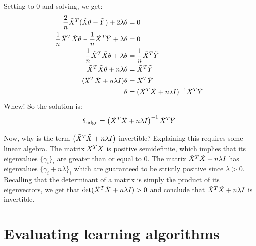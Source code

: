 Setting to 0 and solving, we get:
\begin{align*}
  \frac{2}{n}\tilde{X}^T(\tilde{X}\theta - \tilde{Y}) + 2 \lambda \theta             & = 0                                      \\
  \frac{1}{n}\tilde{X}^T\tilde{X}\theta - \frac{1}{n}\tilde{X}^T\tilde{Y} + \lambda \theta & = 0                                      \\
  \frac{1}{n}\tilde{X}^T\tilde{X}\theta  + \lambda \theta                      & = \frac{1}{n}\tilde{X}^T\tilde{Y}                    \\
  \tilde{X}^T\tilde{X}\theta  + n \lambda \theta                               & = \tilde{X}^T\tilde{Y}                               \\
  (\tilde{X}^T\tilde{X}  + n \lambda I)\theta                                  & = \tilde{X}^T\tilde{Y}                               \\
  \theta                                                           & = (\tilde{X}^T\tilde{X}  + n \lambda I)^{-1}\tilde{X}^T\tilde{Y}
\end{align*}
Whew!  So the solution is:
\begin{equation}
  \theta_{\text{ridge}} = \left(\tilde{X}^T\tilde{X} + n\lambda I\right)^{-1}\tilde{X}^T\tilde{Y}
  \label{eq:ridge_regression_solution}
\end{equation}

Now, why is the term $\left(\tilde{X}^T\tilde{X} + n\lambda I\right)$ invertible? 
Explaining this requires some linear algebra. The matrix $\tilde{X}^T\tilde{X}$ is positive 
semidefinite, which implies that its eigenvalues $\{\gamma_i\}_i$ are greater
than or equal to 0. The matrix $\tilde{X}^T\tilde{X}+n\lambda I$ has eigenvalues 
$\{\gamma_i+n\lambda\}_i$ which are guaranteed to be strictly positive since
$\lambda>0$. Recalling that the determinant of a matrix is simply the product of its eigenvectors, 
we get that $\det(\tilde{X}^T\tilde{X} + n\lambda I)>0$ and conclude that $\tilde{X}^T\tilde{X} + n\lambda I$ is invertible.




\section{Evaluating learning algorithms}\label{sec-reg_learn_alg}

